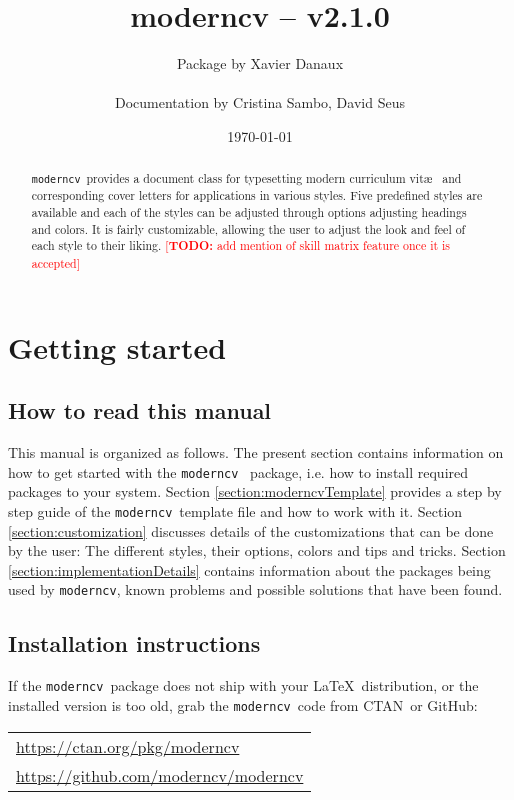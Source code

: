 \documentclass[a4paper,11pt]{article}
\title{\bfseries moderncv -- v2.1.0}
\author{Package by Xavier Danaux \\ \begin{small}Documentation by Cristina Sambo, David Seus \end{small}}
\date{\today}
\newcommand{\todox}[1]{\textcolor{red}{[\textbf{TODO:} #1]}}
\newcommand{\code}[1]{\lstinline!#1!}
\newcommand{\Code}[1]{\lstinline!#1!~} %
\newcommand{\moderncv}{\code{moderncv}}
\newcommand{\Moderncv}{\Code{moderncv}}
\newcommand{\github}{GitHub}
\newcommand{\Ctan}{CTAN~}
\newcommand{\moderncvGithub}{\url{https://github.com/moderncv/moderncv}}
\newcommand{\moderncvCtan}{\url{https://ctan.org/pkg/moderncv}}
\begin{document}
\maketitle
\begin{abstract}
\noindent 
\Moderncv provides a document class for typesetting modern curriculum vit\ae~ and corresponding cover letters 
for applications in various styles. 
Five predefined styles are available and each of the styles can be adjusted through options adjusting headings and colors.  
It is fairly customizable, allowing the user to adjust the look and feel of each style to their liking.
\todox{add mention of skill matrix feature once it is accepted}
\end{abstract}
\tableofcontents

\section{Getting started}
\subsection{How to read this manual}
This manual is organized as follows.
The present section contains information on how to get started with the \Moderncv 
package, i.e. how to install required packages to your system.
% 
% 
Section \ref{section:moderncvTemplate} provides a step by step guide of the \Moderncv template file and how to work with it. 
% 
Section \ref{section:customization} discusses details of the customizations that can be done by the user: 
The different styles, their options, colors and tips and tricks.
% 
Section \ref{section:implementationDetails} contains information about the packages being used by \moderncv, 
known problems and possible solutions that have been found. 

\subsection{Installation instructions}
If the \Moderncv package does not ship with your \LaTeX\ distribution, or the installed version is too old, 
grab the \Moderncv code from \Ctan or \github: \medskip

\begin{tabular}{l}
  \moderncvCtan \\%
  \moderncvGithub
\end{tabular}
\end{document}

